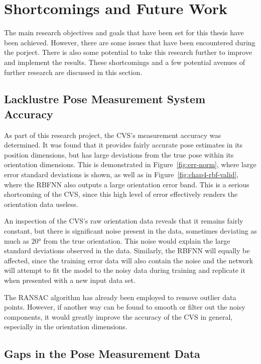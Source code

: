 \section{Shortcomings and Future Work}

The main research objectives and goals that have been set for this thesis have been achieved. However, there are some issues that have been encountered during the porject. There is also some potential to take this research further to improve and implement the results. These shortcomings and a few potential avenues of further research are discussed in this section. 

\subsection{Lacklustre Pose Measurement System Accuracy}

As part of this research project, the CVS's measurement accuracy was determined. It was found that it provides fairly accurate pose estimates in its position dimensions, but has large deviations from the true pose within its orientation dimensions. This is demonstrated in Figure~\ref{fig:err-norm}, where large error standard deviations is shown, as well as in Figure~\ref{fig:chap4-rbf-valid}, where the RBFNN also outputs a large orientation error band. This is a serious shortcoming of the CVS, since this high level of error effectively renders the orientation data useless. 

An inspection of the CVS's raw orientation data reveals that it remains fairly constant, but there is significant noise present in the data, sometimes deviating as much as $\ang{20}$ from the true orientation. This noise would explain the large standard deviations observed in the data. Similarly, the RBFNN will equally be affected, since the training error data will also contain the noise and the network will attempt to fit the model to the noisy data during training and replicate it when presented with a new input data set. 

The RANSAC algorithm has already been employed to remove outlier data points. However, if another way can be found to smooth or filter out the noisy components, it would greatly improve the accuracy of the CVS in general, especially in the orientation dimensions. 

\subsection{Gaps in the Pose Measurement Data}

